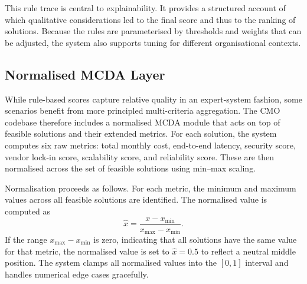 \documentclass[journal]{IEEEtran}
\newcommand{\cmo}{CMO\xspace}
\begin{document}
This rule trace is central to explainability. It provides a structured account
of which qualitative considerations led to the final score and thus to the
ranking of solutions. Because the rules are parameterised by thresholds and
weights that can be adjusted, the system also supports tuning for different
organisational contexts.

\subsection{Normalised MCDA Layer}
\label{sec:mcda}

While rule-based scores capture relative quality in an expert-system fashion,
some scenarios benefit from more principled multi-criteria aggregation. The
\cmo codebase therefore includes a normalised MCDA module that acts on top of
feasible solutions and their extended metrics. For each solution, the system
computes six raw metrics: total monthly cost, end-to-end latency, security
score, vendor lock-in score, scalability score, and reliability score. These
are then normalised across the set of feasible solutions using min--max scaling.

Normalisation proceeds as follows. For each metric, the minimum and maximum
values across all feasible solutions are identified. The normalised value is
computed as
\begin{equation}
  \hat{x} = \frac{x - x_{\min}}{x_{\max} - x_{\min}}.  \label{eq:minmax}
\end{equation}
If the range $x_{\max} - x_{\min}$ is zero, indicating that all solutions have
the same value for that metric, the normalised value is set to $\hat{x} = 0.5$
to reflect a neutral middle position. The system clamps all normalised values
into the $[0,1]$ interval and handles numerical edge cases gracefully.
\end{document}

